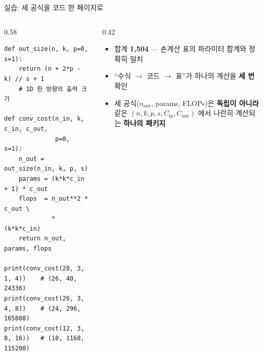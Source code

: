 \begin{frame}[fragile]{실습: 세 공식을 코드 한 페이지로}
  \begin{columns}[T]
    \begin{column}{0.58\textwidth}
\begin{lstlisting}
def out_size(n, k, p=0, s=1):
    return (n + 2*p - k) // s + 1
    # 1D 한 방향의 출력 크기

def conv_cost(n_in, k, c_in, c_out,
              p=0, s=1):
    n_out = out_size(n_in, k, p, s)
    params = (k*k*c_in + 1) * c_out
    flops  = n_out**2 * c_out \
             * (k*k*c_in)
    return n_out, params, flops

print(conv_cost(28, 3, 1, 4))    # (26, 40, 24336)
print(conv_cost(26, 3, 4, 8))    # (24, 296, 165888)
print(conv_cost(12, 3, 8, 16))   # (10, 1168, 115200)
\end{lstlisting}
    \end{column}
    \begin{column}{0.42\textwidth}
      \begin{itemize}
        \item 합계 \textbf{1,504} --- 손계산 표의
          파라미터 합계와 정확히 일치
        \item ``수식 $\to$ 코드 $\to$ 표''가
          하나의 계산을 \textbf{세 번} 확인
        \item 세 공식($n_{\text{out}}$, params, FLOPs)은
          \textbf{독립이 아니라} 같은
          $(n,k,p,s,C_{\text{in}},C_{\text{out}})$ 에서
          나란히 계산되는 \textbf{하나의 패키지}
      \end{itemize}
    \end{column}
  \end{columns}
\end{frame}
